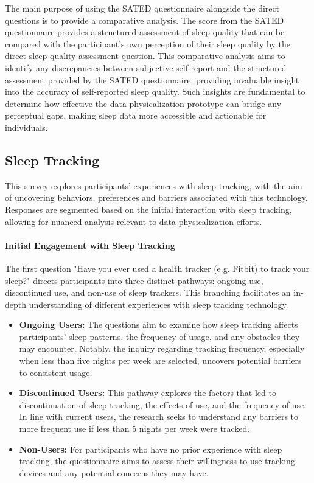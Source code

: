 \documentclass[
  a4paper,  %
  twoside,  %
  bibliography=totoc,
  headsepline,
  cleardoublepage=empty,
  parskip=half,
  draft=false
]{scrbook}
\begin{document}
The main purpose of using the SATED questionnaire alongside the direct questions is to provide a comparative analysis. The score from the SATED questionnaire provides a structured assessment of sleep quality that can be compared with the participant's own perception of their sleep quality by the direct sleep quality assessment question. This comparative analysis aims to identify any discrepancies between subjective self-report and the structured assessment provided by the SATED questionnaire, providing invaluable insight into the accuracy of self-reported sleep quality. Such insights are fundamental to determine how effective the data physicalization prototype can bridge any perceptual gaps, making sleep data more accessible and actionable for individuals.
\subsection{Sleep Tracking}
This survey explores participants' experiences with sleep tracking, with the aim of uncovering behaviors, preferences and barriers associated with this technology. Responses are segmented based on the initial interaction with sleep tracking, allowing for nuanced analysis relevant to data physicalization efforts.
\paragraph{Initial Engagement with Sleep Tracking}
The first question "Have you ever used a health tracker (e.g. Fitbit) to track your sleep?" directs participants into three distinct pathways: ongoing use, discontinued use, and non-use of sleep trackers. This branching facilitates an in-depth understanding of different experiences with sleep tracking technology.
\begin{itemize}
    \item \textbf{Ongoing Users:} The questions aim to examine how sleep tracking affects participants' sleep patterns, the frequency of usage, and any obstacles they may encounter. Notably, the inquiry regarding tracking frequency, especially when less than five nights per week are selected, uncovers potential barriers to consistent usage.
    \item \textbf{Discontinued Users:} This pathway explores the factors that led to discontinuation of sleep tracking, the effects of use, and the frequency of use. In line with current users, the research seeks to understand any barriers to more frequent use if less than 5 nights per week were tracked.
    \item \textbf{Non-Users:} For participants who have no prior experience with sleep tracking, the questionnaire aims to assess their willingness to use tracking devices and any potential concerns they may have.
\end{itemize}
\end{document}
